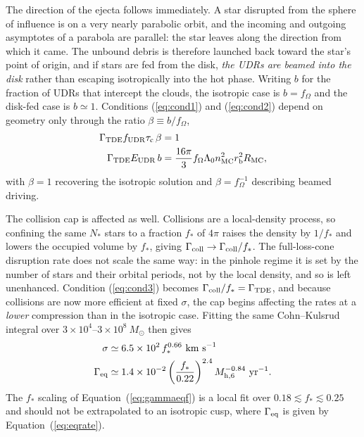 \documentclass[preprint2]{aastex}
\newcommand{\msun}{M_{\odot}\xspace}
\newcommand{\mhsix}{M_{\rm h,6}\xspace}
\begin{document}
The direction of the ejecta follows immediately. A star disrupted from the sphere of influence is on a very nearly parabolic orbit, and the incoming and outgoing asymptotes of a parabola are parallel: the star leaves along the direction from which it came. The unbound debris is therefore launched back toward the star's point of origin, and if stars are fed from the disk, {\it the UDRs are beamed into the disk} rather than escaping isotropically into the hot phase. Writing $b$ for the fraction of UDRs that intercept the clouds, the isotropic case is $b = f_{\Omega}$ and the disk-fed case is $b \simeq 1$. Conditions (\ref{eq:cond1}) and (\ref{eq:cond2}) depend on geometry only through the ratio $\beta \equiv b/f_{\Omega}$,
\begin{align}
\Gamma_{\rm TDE} f_{\rm UDR} \tau_{\rm c}\, \beta &= 1\\
\Gamma_{\rm TDE} E_{\rm UDR}\, b &= \frac{16 \pi}{3} f_{\Omega} \Lambda_{0} n_{\rm MC}^{2} r_{\rm b}^{2} R_{\rm MC},
\end{align}
with $\beta = 1$ recovering the isotropic solution and $\beta = f_{\Omega}^{-1}$ describing beamed driving.

The collision cap is affected as well. Collisions are a local-density process, so confining the same $N_{\ast}$ stars to a fraction $f_{\ast}$ of $4\pi$ raises the density by $1/f_{\ast}$ and lowers the occupied volume by $f_{\ast}$, giving $\Gamma_{\rm coll} \rightarrow \Gamma_{\rm coll}/f_{\ast}$. The full-loss-cone disruption rate does not scale the same way: in the pinhole regime it is set by the number of stars and their orbital periods, not by the local density, and so is left unenhanced. Condition (\ref{eq:cond3}) becomes $\Gamma_{\rm coll}/f_{\ast} = \Gamma_{\rm TDE}$, and because collisions are now more efficient at fixed $\sigma$, the cap begins affecting the rates at a {\it lower} compression than in the isotropic case. Fitting the same Cohn--Kulsrud integral over $3 \times 10^{4}$--$3 \times 10^{8}~\msun$ then gives
\begin{align}
\sigma &\simeq 6.5 \times 10^{2}\, f_{\ast}^{0.66}~{\rm km~s}^{-1}\\
\Gamma_{\rm eq} &\simeq 1.4 \times 10^{-2} \left(\frac{f_{\ast}}{0.22}\right)^{2.4} \mhsix^{-0.84}~{\rm yr}^{-1}.\label{eq:gammaeqf}
\end{align}
The $f_{\ast}$ scaling of Equation~(\ref{eq:gammaeqf}) is a local fit over $0.18 \lesssim f_{\ast} \lesssim 0.25$ and should not be extrapolated to an isotropic cusp, where $\Gamma_{\rm eq}$ is given by Equation~(\ref{eq:eqrate}).
\end{document}
